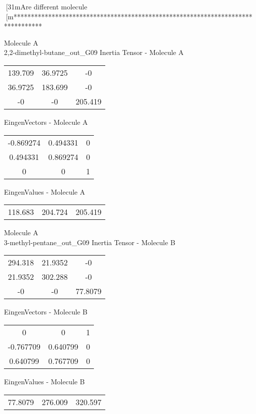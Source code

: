 [31mAre different molecule
[m********************************************************************************
\newpage
\begin{multicols}{2}
\begin{center}
Molecule A \\ 
2,2-dimethyl-butane_out_G09
Inertia Tensor - Molecule A \\
\vtab
\begin{tabular}{|c c c|}
139.709	 & 	36.9725	 & 	-0	 \\
36.9725	 & 	183.699	 & 	-0	 \\
-0	 & 	-0	 & 	205.419
\end{tabular}

\vtab
 EingenVectors - Molecule A     \\
\vtab
\begin{tabular}{|c c c|}
-0.869274	 & 	0.494331	 & 	0	 \\
0.494331	 & 	0.869274	 & 	0	 \\
0	 & 	0	 & 	1
\end{tabular}

\vtab
 EingenValues - Molecule A     \\
\vtab
\begin{tabular}{|c c c|}
118.683	 & 	204.724	 & 	205.419
\end{tabular}
\columnbreak
Molecule A \\ 
3-methyl-pentane_out_G09
Inertia Tensor - Molecule B \\
\vtab
\begin{tabular}{|c c c|}
294.318	 & 	21.9352	 & 	-0	 \\
21.9352	 & 	302.288	 & 	-0	 \\
-0	 & 	-0	 & 	77.8079
\end{tabular}

\vtab
 EingenVectors - Molecule B     \\
\vtab
\begin{tabular}{|c c c|}
0	 & 	0	 & 	1	 \\
-0.767709	 & 	0.640799	 & 	0	 \\
0.640799	 & 	0.767709	 & 	0
\end{tabular}

\vtab
 EingenValues - Molecule B     \\
\vtab
\begin{tabular}{|c c c|}
77.8079	 & 	276.009	 & 	320.597
\end{tabular}
\end{center}
\end{multicols}
